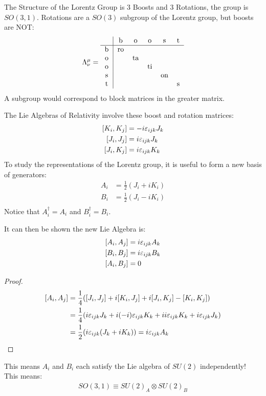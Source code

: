 \begin{aside}
  The Structure of the Lorentz Group is 3 Boosts and 3 Rotations, the group is $SO(3,1)$. Rotations are a $SO(3)$ subgroup of the Lorentz group, but boosts are NOT:
  \begin{align*}
    \Lambda^\mu_\nu=
    \begin{tabular}{c|ccccc}
        & b  & o  & o  & s  & t \\ \hline
      b & ro &    &    &    &   \\
      o &    & ta &    &    &   \\
      o &    &    & ti &    &   \\
      s &    &    &    & on &   \\
      t &    &    &    &    & s
    \end{tabular}
  \end{align*}
  A subgroup would correspond to block matrices in the greater matrix.
\end{aside}
The Lie Algebras of Relativity involve these boost and rotation matrices:
\begin{align*}
  \comm{K_i}{K_j}&=-i\veps_{ijk}J_k\\
  \comm{J_i}{J_j}&= i\veps_{ijk}J_k\\
  \comm{J_i}{K_j}&= i\veps_{ijk}K_k
\end{align*}
To study the representations of the Lorentz group, it is useful to form a new basis of generators:
\begin{align*}
  A_i&=\frac12(J_i+iK_i)\\
  B_i&=\frac12(J_i-iK_i)\\
\end{align*}
Notice that $A_i^\dag=A_i$ and $B_i^\dag=B_i$.

It can then be shown the new Lie Algebra is:
\begin{align*}
  \comm{A_i}{A_j}&=i\veps_{ijk}A_k\\
  \comm{B_i}{B_j}&=i\veps_{ijk}B_k\\
  \comm{A_i}{B_j}&=0
\end{align*}
\begin{proof}
  \begin{align*}
    \comm{A_i}{A_j}&=\frac14\qty(
    \comm{J_i}{J_j}+i\comm{K_i}{J_j}+i\comm{J_i}{K_j}-\comm{K_i}{K_j})\\
    &=\frac14\qty(
    i\veps_{ijk}J_k+i(-i)\veps_{ijk}K_k+ii\veps_{ijk}K_k+i\veps_{ijk}J_k)\\
    &=\frac12\qty(i\veps_{ijk}(J_k+iK_k))=i\veps_{ijk}A_k
  \end{align*}
\end{proof}
This means $A_i$ and $B_i$ each satisfy the Lie algebra of $SU(2)$ independently! This means:
\begin{align*}
  SO(3,1)\equiv SU(2)_A\otimes SU(2)_B
\end{align*}


